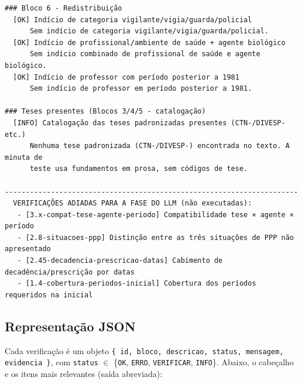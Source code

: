 \documentclass[11pt,a4paper]{article}
\newcommand{\status}[1]{\texttt{#1}}
\begin{document}
\begin{lstlisting}[style=terminal]
### Bloco 6 - Redistribuição
  [OK] Indício de categoria vigilante/vigia/guarda/policial
      Sem indício de categoria vigilante/vigia/guarda/policial.
  [OK] Indício de profissional/ambiente de saúde + agente biológico
      Sem indício combinado de profissional de saúde e agente biológico.
  [OK] Indício de professor com período posterior a 1981
      Sem indício de professor em período posterior a 1981.

### Teses presentes (Blocos 3/4/5 - catalogação)
  [INFO] Catalogação das teses padronizadas presentes (CTN-/DIVESP- etc.)
      Nenhuma tese padronizada (CTN-/DIVESP-) encontrada no texto. A minuta de
      teste usa fundamentos em prosa, sem códigos de tese.

----------------------------------------------------------------------
  VERIFICAÇÕES ADIADAS PARA A FASE DO LLM (não executadas):
   - [3.x-compat-tese-agente-periodo] Compatibilidade tese × agente × período
   - [2.8-situacoes-ppp] Distinção entre as três situações de PPP não apresentado
   - [2.45-decadencia-prescricao-datas] Cabimento de decadência/prescrição por datas
   - [1.4-cobertura-periodos-inicial] Cobertura dos períodos requeridos na inicial
\end{lstlisting}

\subsection{Representação JSON}
Cada verificação é um objeto
\texttt{\{ id, bloco, descricao, status, mensagem, evidencia \}}, com
\texttt{status} $\in$ \{\status{OK}, \status{ERRO}, \status{VERIFICAR},
\status{INFO}\}. Abaixo, o cabeçalho e os itens mais relevantes (saída
abreviada):
\end{document}

